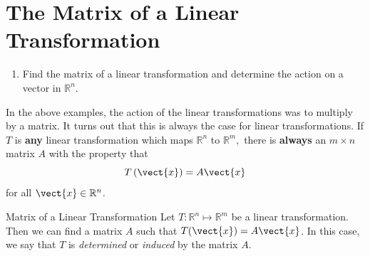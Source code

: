 \section{The Matrix of a Linear \texorpdfstring{\\}{ } Transformation}

\begin{outcome}
\begin{enumerate}
\item[A.]  Find the matrix of a linear transformation and determine the action on a vector in $\mathbb{R}^n$.   
\end{enumerate}
\end{outcome}

In the above examples, the action of the linear transformations was to multiply by a matrix. 
It turns out that this is always the case for linear transformations.
If $T$ is \textbf{any} linear transformation which maps $\mathbb{R}^{n}$ to 
$\mathbb{R}^{m},$ there is \textbf{always} an $m\times n$ matrix $A$ with the
property that
\begin{equation}
T\left(\vect{x}\right) = A\vect{x} \label{matrixoftransf}
\end{equation}
for all $\vect{x} \in \mathbb{R}^{n}$.

\begin{theorem}{Matrix of a Linear Transformation}\label{thm:matrixlintransf}
Let $T:\mathbb{R}^{n}\mapsto \mathbb{R}^{m}$ be a linear transformation. Then we can find a matrix $A$ such that $T(\vect{x}) = A\vect{x}$. 
 In this case, we say that $T$ is {\em determined\em} or {\em induced\em}
by the matrix $A$.
\end{theorem}

